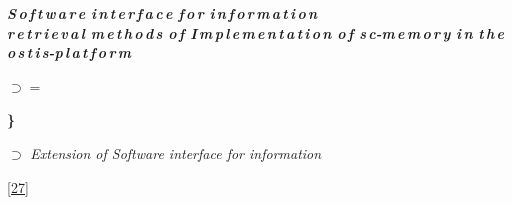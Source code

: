\documentclass[10pt, twocolumn, a4paper]{article}
\begin{document}
\noindent \textbf{\textit{S\,o\,f\,t\,w\,a\,r\,e i\,n\,t\,e\,r\,f\,a\,c\,e f\,o\,r i\,n\,f\,o\,r\,m\,a\,t\,i\,o\,n\\
r\,e\,t\,r\,i\,e\,v\,a\,l m\,e\,t\,h\,o\,d\,s o\,f
I\,m\,p\,l\,e\,m\,e\,n\,t\,a\,t\,i\,o\,n o\,f
s\,c-m\,e\,m\,o\,r\,y i\,n t\,h\,e o\,s\,t\,i\,s-p\,l\,a\,t\,f\,o\,r\,m\\}}

\begin{level1}
 \item[\textbf{$\supset=$} ]
 \item[\textbf{\}}] 
  \item[\textbf{$\supset$} ] \textit{Extension of Software interface for information}
\end{level1}


\href{https://ru.wikipedia.org/wiki/%D0%90%D1%80%D0%B1%D1%83%D0%B7}{[27]}
\end{document}
